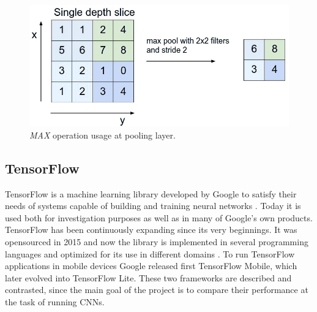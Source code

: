 \begin{figure}[h!]
  \includegraphics[width=\linewidth]{img/maxpool.jpg}
  \caption{\small \textit{MAX} operation usage at pooling layer.}
  \label{fig:pooling}
\end{figure}
 
\subsection{TensorFlow}
TensorFlow is a machine learning library developed by Google to satisfy their needs of systems capable of building and training neural networks \cite{tf_descpt}. Today it is used both for investigation purposes as well as in many of Google's own products. TensorFlow has been continuously expanding since its very beginnings. It was opensourced in 2015 and now the library is implemented in several programming languages and optimized for its use in different domains \cite{abadi2016tensorflow}. To run TensorFlow applications in mobile devices Google released first TensorFlow Mobile, which later evolved into TensorFlow Lite. These two frameworks are described and contrasted, since the main goal of the project is to compare their performance at the task of running CNNs.

